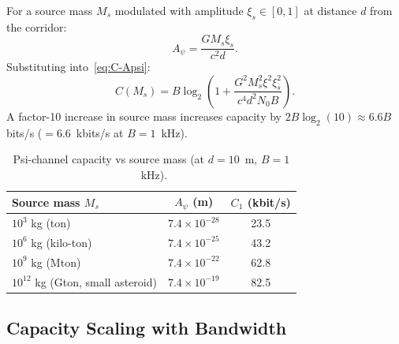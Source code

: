 \documentclass[aps,prd,twocolumn,superscriptaddress,nofootinbib]{revtex4-2}
\begin{document}
For a source mass $M_s$ modulated with amplitude $\xi_s \in [0,1]$ at
distance $d$ from the corridor:
\begin{equation}
A_\psi = \frac{G M_s \xi_s}{c^2 d}.
\label{eq:Apsi-mass}
\end{equation}
Substituting into~\eqref{eq:C-Apsi}:
\begin{equation}
C(M_s) = B\log_2\!\left(1 + \frac{G^2 M_s^2 \xi^2 \xi_s^2}{c^4 d^2 N_0 B}\right).
\label{eq:C-mass}
\end{equation}
A factor-10 increase in source mass increases capacity by $2B\log_2(10) \approx 6.6B$
bits/s ($= 6.6$~kbits/s at $B=1$~kHz).

\begin{table}[h]
\centering
\caption{Psi-channel capacity vs source mass (at $d = 10$~m, $B = 1$~kHz).}
\begin{tabular}{lcc}
\hline\hline
Source mass $M_s$ & $A_\psi$ (m) & $C_1$ (kbit/s) \\
\hline
$10^3$ kg (ton) & $7.4\times10^{-28}$ & 23.5 \\
$10^6$ kg (kilo-ton) & $7.4\times10^{-25}$ & 43.2 \\
$10^9$ kg (Mton) & $7.4\times10^{-22}$ & 62.8 \\
$10^{12}$ kg (Gton, small asteroid) & $7.4\times10^{-19}$ & 82.5 \\
\hline\hline
\end{tabular}
\label{tab:mass-scaling}
\end{table}

\subsection{Capacity Scaling with Bandwidth}
\end{document}
